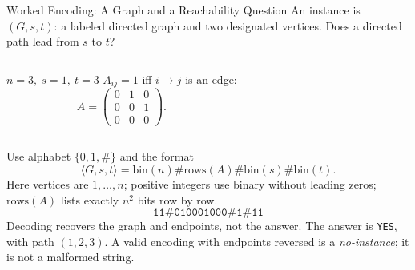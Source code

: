 \documentclass[10pt]{beamer}
\begin{document}
\begin{frame}{Worked Encoding: A Graph and a Reachability Question}
  \small
  An instance is $(G,s,t)$: a labeled directed graph and two designated
  vertices. Does a directed path lead from $s$ to $t$?
  \begin{columns}[T]
    \centering
    \par\smallskip $n=3,\ s=1,\ t=3$
    $A_{ij}=1$ iff $i\to j$ is an edge:
    \[
      A=\begin{pmatrix}0&1&0\\0&0&1\\0&0&0\end{pmatrix}.
    \]
  \end{columns}
  \pause
  Use alphabet $\{0,1,\#\}$ and the format
  \[
    \langle G,s,t\rangle=\text{bin}(n)\#
      \text{rows}(A)\#\text{bin}(s)\#\text{bin}(t).
  \]
  Here vertices are $1,\ldots,n$; positive integers use binary without
  leading zeros; $\text{rows}(A)$ lists exactly $n^2$ bits row by row.
  \[
    \boxed{\texttt{11\#010001000\#1\#11}}
  \]
  \pause
  Decoding recovers the graph and endpoints, not the answer. The answer
  is \texttt{YES}, with path $(1,2,3)$. A valid encoding with endpoints
  reversed is a \emph{no-instance}; it is not a malformed string.
\end{frame}
\end{document}

